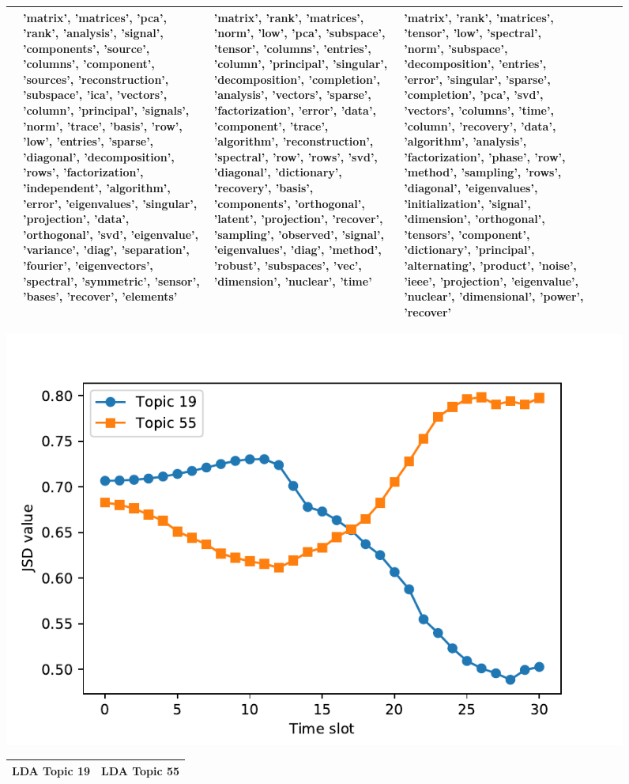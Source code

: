 \documentclass[a4paper]{report}
\begin{document}
\begin{figure}[t]
\begin{center}
\begin{tabular}{|p{1.8cm}|p{1.8cm}|p{1.8cm}|p{1.8cm}|p{1.8cm}|p{1.8cm}|p{1.8cm}|}
&
'matrix', 'matrices', 'pca', 'rank', 'analysis', 'signal', 'components', 'source', 'columns', 'component', 'sources', 'reconstruction', 'subspace', 'ica', 'vectors', 'column', 'principal', 'signals', 'norm', 'trace', 'basis', 'row', 'low', 'entries', 'sparse', 'diagonal', 'decomposition', 'rows', 'factorization', 'independent', 'algorithm', 'error', 'eigenvalues', 'singular', 'projection', 'data', 'orthogonal', 'svd', 'eigenvalue', 'variance', 'diag', 'separation', 'fourier', 'eigenvectors', 'spectral', 'symmetric', 'sensor', 'bases', 'recover', 'elements'
&
'matrix', 'rank', 'matrices', 'norm', 'low', 'pca', 'subspace', 'tensor', 'columns', 'entries', 'column', 'principal', 'singular', 'decomposition', 'completion', 'analysis', 'vectors', 'sparse', 'factorization', 'error', 'data', 'component', 'trace', 'algorithm', 'reconstruction', 'spectral', 'row', 'rows', 'svd', 'diagonal', 'dictionary', 'recovery', 'basis', 'components', 'orthogonal', 'latent', 'projection', 'recover', 'sampling', 'observed', 'signal', 'eigenvalues', 'diag', 'method', 'robust', 'subspaces', 'vec', 'dimension', 'nuclear', 'time'
&
'matrix', 'rank', 'matrices', 'tensor', 'low', 'spectral', 'norm', 'subspace', 'decomposition', 'entries', 'error', 'singular', 'sparse', 'completion', 'pca', 'svd', 'vectors', 'columns', 'time', 'column', 'recovery', 'data', 'algorithm', 'analysis', 'factorization', 'phase', 'row', 'method', 'sampling', 'rows', 'diagonal', 'eigenvalues', 'initialization', 'signal', 'dimension', 'orthogonal', 'tensors', 'component', 'dictionary', 'principal', 'alternating', 'product', 'noise', 'ieee', 'projection', 'eigenvalue', 'nuclear', 'dimensional', 'power', 'recover'
\\ \hline

\end{tabular}
\includegraphics[scale=0.7]{JSgraph.pdf}
\tiny
\begin{tabular}{|p{7cm}|p{7cm}|}
\hline \bf LDA Topic 19 & \bf LDA Topic 55 \\ \hline


\end{tabular}
\end{center}
\end{figure}
\end{document}
